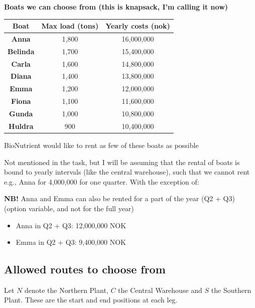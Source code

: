 \documentclass[10pt]{article}
\begin{document}
\textbf{Boats we can choose from (this is knapsack, I'm calling it now)}
\begin{center}
    \begin{tabular}{|c|c|c|}
        \hline 
        \textbf{Boat} & \textbf{Max load (tons)} & \textbf{Yearly costs (nok)}\\\hline 
        \textbf{Anna} & 1,800 & 16,000,000\\\hline 
        \textbf{Belinda} & 1,700 & 15,400,000\\\hline 
        \textbf{Carla} & 1,600 & 14,800,000\\\hline 
        \textbf{Diana} & 1,400 & 13,800,000\\\hline 
        \textbf{Emma} & 1,200 & 12,000,000\\\hline 
        \textbf{Fiona} & 1,100 & 11,600,000\\\hline 
        \textbf{Gunda} & 1,000 & 10,800,000\\\hline 
        \textbf{Huldra} & 900 & 10,400,000\\\hline 
    \end{tabular}
\end{center}
BioNutrient would like to rent as few of these boats as possible 

Not mentioned in the task, but I will be assuming that the rental of boats is bound to yearly intervals (like the central warehouse), such that we cannot rent e.g., Anna for 4,000,000 for one quarter. With the exception of:

\textbf{NB!} Anna and Emma can also be rented for a part of the year (Q2 + Q3) (option variable, and not for the full year)
\begin{itemize}
    \item Anna in Q2 + Q3: 12,000,000 NOK 
    \item Emma in Q2 + Q3: 9,400,000 NOK 
\end{itemize}

\subsection{Allowed routes to choose from}
Let $N $ denote the Northern Plant, $C $ the Central Warehouse and $S $ the Southern Plant. These are the start and end positions at each leg.
\end{document}
